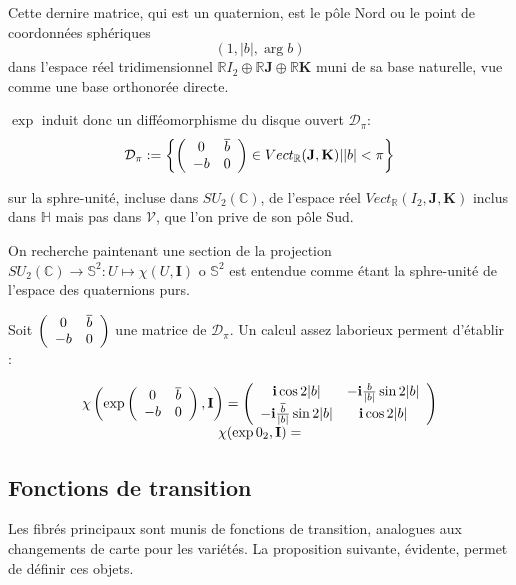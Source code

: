 Cette dernire matrice, qui est un quaternion, est le p\^ole Nord ou le point de coordonn\'ees sph\'eriques
\[(1,|b|,\arg b)\]
dans l'espace r\'eel tridimensionnel $\mathbb{R}I_2\oplus\mathbb{R}\mathbf{J}\oplus\mathbb{R}\mathbf{K}$ muni de sa base naturelle, %
vue comme une base orthonor\'ee directe.

\par
$\exp$ induit donc un diff\'eomorphisme du disque ouvert $\mathcal{D_{\pi}}$:
\[\mathcal{D_{\pi}}:=\left\{\left(\begin{array}{cc}0&\overline{b}\\-b&0\end{array}\right)\in Vect_{\mathbb{R}}(\mathbf{J},\mathbf{K})| |b|<\pi\right\}\]

sur la sphre-unit\'e, incluse dans $SU_2(\mathbb{C})$, de l'espace r\'eel $Vect_{\mathbb{R}}(I_2,\mathbf{J},\mathbf{K})$ inclus dans $\mathbb{H}$ mais pas dans $\mathcal{V}$, %
que l'on prive de son p\^ole Sud.


\par
On recherche paintenant une section de la projection $SU_2(\mathbb{C})\rightarrow \mathbb{S}^2 : U\mapsto \chi (U,\mathbf{I})$ %
o $\mathbb{S}^2$ est entendue comme \'etant la sphre-unit\'e de l'espace des quaternions purs.

\par
Soit $\left(\begin{array}{cc}0&\overline{b}\\-b&0\end{array}\right)$ une matrice de $\mathcal{D_{\pi}}$. Un calcul assez laborieux perment d'\'etablir :

\[%
\begin{array}{c}
\chi\left(\exp\mcd{0}{\overline{b}}{-b}{0},\mathbf{I}\right)=\mcd{\mathbf{i}\cos 2|b|}{-\mathbf{i}\frac{b}{|b|}\sin 2|b|}{-\mathbf{i}\frac{\overline{b}}{|b|}\sin 2|b|}{\mathbf{i}\cos 2|b|}%
\\%
\chi (\exp 0_2,\mathbf{I})=
\end{array}%
\]


\subsection{Fonctions de transition}

Les fibr\'es principaux sont munis de fonctions de transition, analogues aux changements de carte pour les variétés. La proposition suivante, évidente, permet de définir ces objets.

